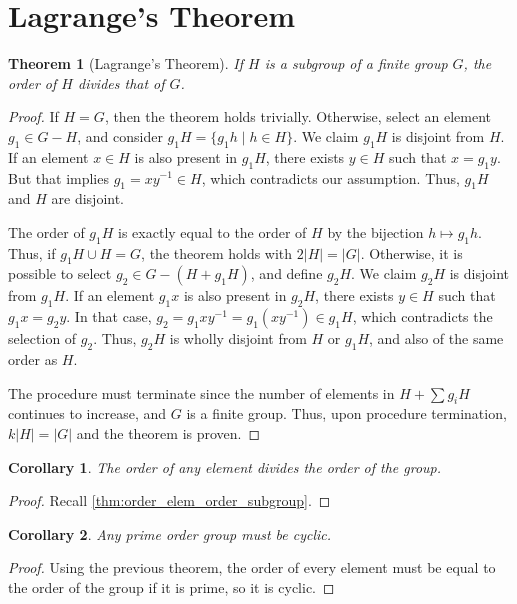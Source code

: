 \documentclass{article}
\newtheorem{theorem}{Theorem}[section]
\newtheorem{corollary}{Corollary}[theorem]
\begin{document}
\section {Lagrange's Theorem}

\begin{theorem}[Lagrange's Theorem]
    If $H$ is a subgroup of a finite group $G$, the order of $H$ divides that of $G$.
\end{theorem}
\begin{proof}
    If $H = G$, then the theorem holds trivially.
    Otherwise, select an element $g_{1} \in G - H$, and consider $g_{1}H = \{g_{1}h \mid h \in H\}$.
    We claim $g_{1}H$ is disjoint from $H$.
    If an element $x \in H$ is also present in $g_{1}H$, there exists $y \in H$ such that $x = g_{1}y$.
    But that implies $g_{1} = xy^{-1} \in H$, which contradicts our assumption. Thus, $g_{1}H$ and $H$ are disjoint.

    The order of $g_{1}H$ is exactly equal to the order of $H$ by the bijection $h \mapsto g_{1}h$.
    Thus, if $g_{1}H \cup H = G$, the theorem holds with $2|H| = |G|$.
    Otherwise, it is possible to select $g_{2} \in G - (H + g_{1}H)$, and define $g_{2}H$.
    We claim $g_{2}H$ is disjoint from $g_{1}H$.
    If an element $g_{1}x$ is also present in $g_{2}H$, there exists $y \in H$ such that $g_{1}x = g_{2}y$.
    In that case, $g_{2} = g_{1}xy^{-1} = g_{1}(xy^{-1}) \in g_{1}H$, which contradicts the selection of $g_{2}$.
    Thus, $g_{2}H$ is wholly disjoint from $H$ or $g_{1}H$, and also of the same order as $H$.

    The procedure must terminate since the number of elements in $H + \sum g_i H$ continues to increase,
    and $G$ is a finite group.
    Thus, upon procedure termination, $k|H| = |G|$ and the theorem is proven.
\end{proof}

\begin{corollary}
    \label{thm:order_elem_divide_order_group}
    The order of any element divides the order of the group.
\end{corollary}
\begin{proof}
    Recall \autoref{thm:order_elem_order_subgroup}.
\end{proof}

\begin{corollary}
    Any prime order group must be cyclic.
\end{corollary}
\begin{proof}
    Using the previous theorem, the order of every element must be equal to the order of the group if it is prime, so it is cyclic.
\end{proof}
\end{document}
